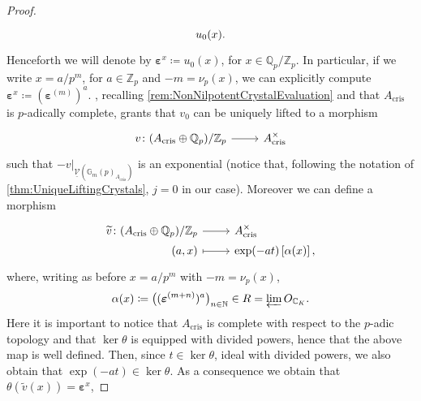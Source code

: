 \begin{proof}
\begin{equation*}
\begin{tikzcd}[row sep = 0ex
		,/tikz/column 1/.append style={anchor=base east}
		,/tikz/column 2/.append style={anchor=base west}]
		u_0(x)
	.\end{tikzcd}
	\end{equation*} 
	Henceforth we will denote by $\boldsymbol\varepsilon^x \coloneqq u_0(x)$,
	for $x \in \mathbb{Q}_p/\mathbb{Z}_{p}$.
	In particular, if we write $x = a/p^m$, for $a \in \mathbb{Z}_{p}$ and $-m = \nu_p(x)$,
	we can explicitly compute $\boldsymbol\varepsilon^x \coloneqq 
	\left( \boldsymbol\varepsilon^{(m)} \right)^a$.
	, recalling \cref{rem:NonNilpotentCrystalEvaluation}
	and that $A_{\mathrm{cris}}$ is $p$-adically complete,
	grants that $v_0$ can be uniquely
	lifted to a morphism
	\begin{equation*}
	\begin{tikzcd}[row sep = 0ex
		,/tikz/column 1/.append style={anchor=base east}
		,/tikz/column 2/.append style={anchor=base west}]
		v\colon ( A_{\mathrm{cris}} \oplus \mathbb{Q}_p) / \mathbb{Z}_{p} 
		\arrow[r, "", rightarrow] &
		A_{\mathrm{cris}}^{\times}
	\end{tikzcd}
	\end{equation*} 
	such that $\left.-v\right|_{ \underline{\mathcal{V}}(\mathbb{G}_m(p)_{A_{\mathrm{cris}}}) }$
	is an exponential (notice that, following the notation of \cref{thm:UniqueLiftingCrystals},
	$j = 0$ in our case).
	Moreover we can define a morphism
	\begin{equation*}
	\begin{tikzcd}[row sep = 0ex
		,/tikz/column 1/.append style={anchor=base east}
		,/tikz/column 2/.append style={anchor=base west}]
		\widetilde{v}\colon 
		(A_{\mathrm{cris}} \oplus \mathbb{Q}_p) / \mathbb{Z}_{p}
		\arrow[r, "", rightarrow] &
		A_{\mathrm{cris}}^{\times} \\
		(a,x) \arrow[r, "", mapsto] & 
		\exp(-at)\left[ \alpha(x) \right]
	,\end{tikzcd}
	\end{equation*} 
	where, writing as before $x = a/p^m$ with $-m = \nu_p(x)$,
	\begin{equation*}
	\alpha(x) \coloneqq \big( (\boldsymbol\varepsilon^{(m+n)})^a \big)_{n \in \mathbb{N}} \in
	R = \varprojlim O_{\mathbb{C}_K}
	.\end{equation*}
	Here it is important to notice that $A_{\mathrm{cris}}$ is complete
	with respect to the $p$-adic topology and that $\ker\theta$
	is equipped with divided powers, hence that the above map is well defined.
	Then, since $t \in \ker \theta$, ideal with divided powers, we also obtain that
	$\exp(-at) \in \ker\theta$.
	As a consequence we obtain that $\theta(\widetilde{v}(x)) = \boldsymbol\varepsilon^x$,

\end{proof}
